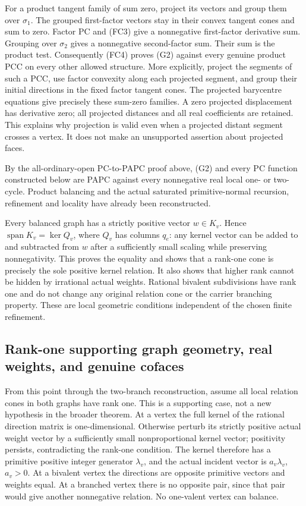 \documentclass[
  11pt,
]{article}
\begin{document}
For a product tangent family of sum zero, project its vectors and group
them over \(\sigma_1\). The grouped first-factor vectors stay in their
convex tangent cones and sum to zero. Factor PC and (FC3) give a
nonnegative first-factor derivative sum. Grouping over \(\sigma_2\)
gives a nonnegative second-factor sum. Their sum is the product test.
Consequently (FC4) proves (G2) against every genuine product PCC on
every other allowed structure. More explicitly, project the segments of
such a PCC, use factor convexity along each projected segment, and group
their initial directions in the fixed factor tangent cones. The
projected barycentre equations give precisely these sum-zero families. A
zero projected displacement has derivative zero; all projected distances
and all real coefficients are retained. This explains why projection is
valid even when a projected distant segment crosses a vertex. It does
not make an unsupported assertion about projected faces.

By the all-ordinary-open PC-to-PAPC proof above, (G2) and every PC
function constructed below are PAPC against every nonnegative real local
one- or two-cycle. Product balancing and the actual saturated
primitive-normal recursion, refinement and locality have already been
reconstructed.

Every balanced graph has a strictly positive vector \(w\in K_v\). Hence
\(\operatorname{span}K_v=\ker Q_v\), where \(Q_v\) has columns \(q_e\):
any kernel vector can be added to and subtracted from \(w\) after a
sufficiently small scaling while preserving nonnegativity. This proves
the equality and shows that a rank-one cone is precisely the sole
positive kernel relation. It also shows that higher rank cannot be
hidden by irrational actual weights. Rational bivalent subdivisions have
rank one and do not change any original relation cone or the carrier
branching property. These are local geometric conditions independent of
the chosen finite refinement.

\subsection{Rank-one supporting graph geometry, real weights, and
genuine
cofaces}\label{rank-one-supporting-graph-geometry-real-weights-and-genuine-cofaces}

From this point through the two-branch reconstruction, assume all local
relation cones in both graphs have rank one. This is a supporting case,
not a new hypothesis in the broader theorem. At a vertex the full kernel
of the rational direction matrix is one-dimensional. Otherwise perturb
its strictly positive actual weight vector by a sufficiently small
nonproportional kernel vector; positivity persists, contradicting the
rank-one condition. The kernel therefore has a primitive positive
integer generator \(\lambda_v\), and the actual incident vector is
\(a_v\lambda_v\), \(a_v>0\). At a bivalent vertex the directions are
opposite primitive vectors and weights equal. At a branched vertex there
is no opposite pair, since that pair would give another nonnegative
relation. No one-valent vertex can balance.
\end{document}
